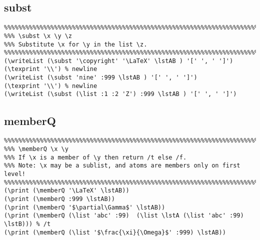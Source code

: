 \documentclass[10pt,a4paper]{article}
\begin{document}
\begin{framed}
\noindent
{}
\end{framed}

\subsection{subst}
\begin{verbatim}
%%%%%%%%%%%%%%%%%%%%%%%%%%%%%%%%%%%%%%%%%%%%%%%%%%%%%%%%%%%%%%%%%%%%%%%%%%%%%
%%% \subst \x \y \z
%%% Substitute \x for \y in the list \z.
%%%%%%%%%%%%%%%%%%%%%%%%%%%%%%%%%%%%%%%%%%%%%%%%%%%%%%%%%%%%%%%%%%%%%%%%%%%%%
(\writeList (\subst '\copyright' '\LaTeX' \lstAB ) '[' ', ' ']')
(\texprint '\\') % newline
(\writeList (\subst 'nine' :999 \lstAB ) '[' ', ' ']')
(\texprint '\\') % newline
(\writeList (\subst (\list :1 :2 'Z') :999 \lstAB ) '[' ', ' ']')
\end{verbatim}

\begin{framed}
\noindent
{}
\end{framed}

\subsection{memberQ}
\begin{verbatim}
%%%%%%%%%%%%%%%%%%%%%%%%%%%%%%%%%%%%%%%%%%%%%%%%%%%%%%%%%%%%%%%%%%%%%%%%%%%%%
%%% \memberQ \x \y
%%% If \x is a member of \y then return /t else /f. 
%%% Note: \x may be a sublist, and atoms are members only on first level!
%%%%%%%%%%%%%%%%%%%%%%%%%%%%%%%%%%%%%%%%%%%%%%%%%%%%%%%%%%%%%%%%%%%%%%%%%%%%%
(\print (\memberQ '\LaTeX' \lstAB))
(\print (\memberQ :999 \lstAB))
(\print (\memberQ '$\partial\Gamma$' \lstAB))
(\print (\memberQ (\list 'abc' :99)  (\list \lstA (\list 'abc' :99) \lstB))) % /t
(\print (\memberQ (\list '$\frac{\xi}{\Omega}$' :999) \lstAB))
\end{verbatim}

\begin{framed}
\noindent
{}
\end{framed}
\end{document}
